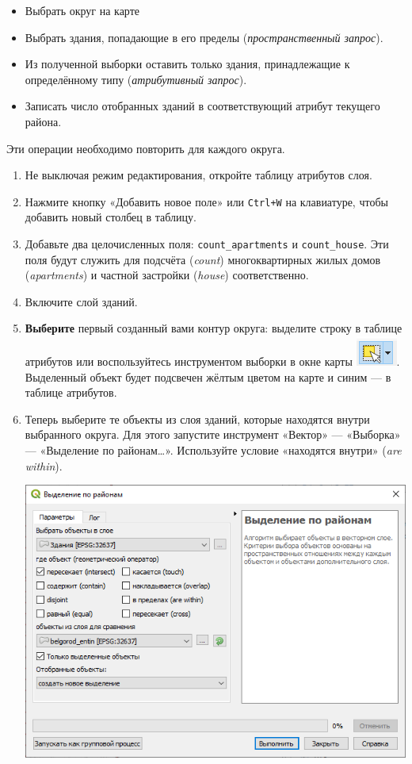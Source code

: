 \documentclass[
  12pt,
]{book}
\begin{document}
\begin{itemize}
\item
  Выбрать округ на карте
\item
  Выбрать здания, попадающие в его пределы (\emph{пространственный запрос}).
\item
  Из полученной выборки оставить только здания, принадлежащие к определённому типу (\emph{атрибутивный запрос}).
\item
  Записать число отобранных зданий в соответствующий атрибут текущего района.
\end{itemize}

Эти операции необходимо повторить для каждого округа.

\begin{enumerate}
\def\labelenumi{\arabic{enumi}.}
\item
  Не выключая режим редактирования, откройте таблицу атрибутов слоя.
\item
  Нажмите кнопку «Добавить новое поле» или \texttt{Ctrl+W} на клавиатуре, чтобы добавить новый столбец в таблицу.
\item
  Добавьте два целочисленных поля: \texttt{count\_apartments} и \texttt{count\_house}. Эти поля будут служить для подсчёта (\emph{count}) многоквартирных жилых домов (\emph{apartments}) и частной застройки (\emph{house}) соответственно.
\item
  Включите слой зданий.
\item
  \textbf{Выберите} первый созданный вами контур округа: выделите строку в таблице атрибутов или воспользуйтесь инструментом выборки в окне карты \includegraphics{images/Ex05/selection1.png}. Выделенный объект будет подсвечен жёлтым цветом на карте и синим --- в таблице атрибутов.
\item
  Теперь выберите те объекты из слоя зданий, которые находятся внутри выбранного округа. Для этого запустите инструмент «Вектор» --- «Выборка» --- «Выделение по районам\ldots». Используйте условие «находятся внутри» (\emph{are within}).

  \includegraphics{images/Ex05/selection2.png}


\end{enumerate}
\end{document}
